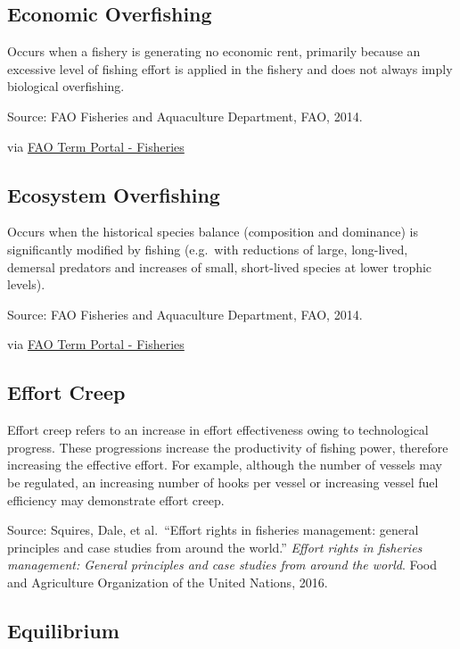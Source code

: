 \documentclass[
  11pt,
]{book}
\begin{document}
\hypertarget{economic-overfishing}{%
\subsection{Economic Overfishing}\label{economic-overfishing}}

Occurs when a fishery is generating no economic rent, primarily because an excessive level of fishing effort is applied in the fishery and does not always imply biological overfishing.

Source: FAO Fisheries and Aquaculture Department, FAO, 2014.

via \href{http://www.fao.org/fishery/glossary/en}{FAO Term Portal - Fisheries}

\hypertarget{ecosystem-overfishing}{%
\subsection{Ecosystem Overfishing}\label{ecosystem-overfishing}}

Occurs when the historical species balance (composition and dominance) is significantly modified by fishing (e.g.~with reductions of large, long-lived, demersal predators and increases of small, short-lived species at lower trophic levels).

Source: FAO Fisheries and Aquaculture Department, FAO, 2014.

via \href{http://www.fao.org/fishery/glossary/en}{FAO Term Portal - Fisheries}

\hypertarget{effort-creep}{%
\subsection{Effort Creep}\label{effort-creep}}

Effort creep refers to an increase in effort effectiveness owing to technological progress. These progressions increase the productivity of fishing power, therefore increasing the effective effort. For example, although the number of vessels may be regulated, an increasing number of hooks per vessel or increasing vessel fuel efficiency may demonstrate effort creep.

Source: Squires, Dale, et al.~``Effort rights in fisheries management: general principles and case studies from around the world.'' \emph{Effort rights in fisheries management: General principles and case studies from around the world}. Food and Agriculture Organization of the United Nations, 2016.

\hypertarget{equilibrium}{%
\subsection{Equilibrium}\label{equilibrium}}
\end{document}

